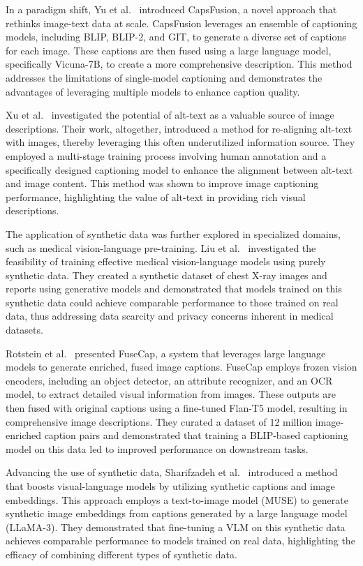 In a paradigm shift, Yu et al.~\cite{yu2024capsfusion} introduced CapsFusion, a novel approach that rethinks image-text data at scale. CapsFusion leverages an ensemble of captioning models, including BLIP, BLIP-2, and GIT, to generate a diverse set of captions for each image. These captions are then fused using a large language model, specifically Vicuna-7B, to create a more comprehensive description. This method addresses the limitations of single-model captioning and demonstrates the advantages of leveraging multiple models to enhance caption quality.

Xu et al.~\cite{xu2024altogether} investigated the potential of alt-text as a valuable source of image descriptions. Their work, altogether, introduced a method for re-aligning alt-text with images, thereby leveraging this often underutilized information source. They employed a multi-stage training process involving human annotation and a specifically designed captioning model to enhance the alignment between alt-text and image content. This method was shown to improve image captioning performance, highlighting the value of alt-text in providing rich visual descriptions.

The application of synthetic data was further explored in specialized domains, such as medical vision-language pre-training. Liu et al.~\cite{liu2024can} investigated the feasibility of training effective medical vision-language models using purely synthetic data. They created a synthetic dataset of chest X-ray images and reports using generative models and demonstrated that models trained on this synthetic data could achieve comparable performance to those trained on real data, thus addressing data scarcity and privacy concerns inherent in medical datasets.

Rotstein et al.~\cite{rotstein2024fusecap} presented FuseCap, a system that leverages large language models to generate enriched, fused image captions. FuseCap employs frozen vision encoders, including an object detector, an attribute recognizer, and an OCR model, to extract detailed visual information from images. These outputs are then fused with original captions using a fine-tuned Flan-T5 model, resulting in comprehensive image descriptions. They curated a dataset of 12 million image-enriched caption pairs and demonstrated that training a BLIP-based captioning model on this data led to improved performance on downstream tasks.

Advancing the use of synthetic data, Sharifzadeh et al.~\cite{sharifzadeh2024synth} introduced a method that boosts visual-language models by utilizing synthetic captions and image embeddings. This approach employs a text-to-image model (MUSE) to generate synthetic image embeddings from captions generated by a large language model (LLaMA-3). They demonstrated that fine-tuning a VLM on this synthetic data achieves comparable performance to models trained on real data, highlighting the efficacy of combining different types of synthetic data.

